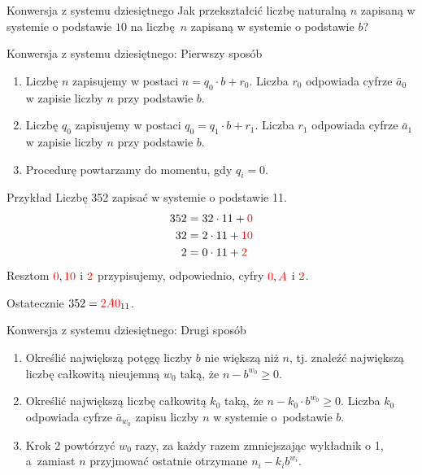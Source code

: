 \documentclass[a4paper,10pt]{beamer}
\begin{document}
\begin{frame}{Konwersja z systemu dziesiętnego}
	Jak przekształcić liczbę naturalną $n$ zapisaną w systemie o podstawie $10$ na liczbę~$n$ zapisaną w systemie o podstawie $b$?
	\begin{block}{Konwersja z systemu dziesiętnego: Pierwszy sposób}
		\begin{enumerate}
			\item Liczbę $n$ zapisujemy w postaci $n=q_0\cdot b+r_0$. Liczba $r_0$ odpowiada cyfrze $\bar{a}_0$ w zapisie liczby $n$ przy podstawie $b$.
			\item Liczbę $q_0$ zapisujemy w postaci $q_0=q_1\cdot b+r_1$. Liczba $r_1$ odpowiada cyfrze $\bar{a}_1$ w zapisie liczby $n$ przy podstawie $b$.
			\item Procedurę powtarzamy do momentu, gdy $q_i=0$.
		\end{enumerate}
	\end{block}
\end{frame}


\begin{frame}
	\begin{exampleblock}{Przykład}
		Liczbę 352 zapisać w systemie o podstawie 11.
		\begin{align*}
			352&=32\cdot11+\textcolor{red}0\\
			32&=2\cdot11+\textcolor{red}{10}\\
			2&=0\cdot11+\textcolor{red}2
		\end{align*}		
		Resztom $\textcolor{red}0,\textcolor{red}{10}$ i $\textcolor{red}2$ przypisujemy, odpowiednio, cyfry $\textcolor{red}0,\textcolor{red}{A}$ i $\textcolor{red}2$.
		
		Ostatecznie $352=\textcolor{red}{2A0}_{11}$.
	\end{exampleblock}
\end{frame}



	
\begin{frame}
	\begin{block}{Konwersja z systemu dziesiętnego: Drugi sposób}
		\begin{enumerate}
			\item Określić największą potęgę liczby $b$ nie większą niż $n$, tj. znaleźć największą liczbę całkowitą nieujemną $w_0$ taką, że $n-b^{w_0}\geq0$.
			\item Określić największą liczbę całkowitą $k_0$ taką, że $n-k_0\cdot b^{w_0}\geq0$. Liczba $k_0$ odpowiada cyfrze $\bar{a}_{w_0}$ zapisu liczby $n$ w systemie o~podstawie $b$.
			\item Krok 2 powtórzyć $w_0$ razy, za każdy razem zmniejszając wykładnik o 1, a~zamiast $n$ przyjmować ostatnie otrzymane $n_i-k_ib^{w_i}$.
		\end{enumerate}
	\end{block}
\end{frame}
\end{document}
